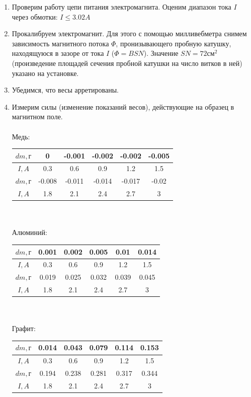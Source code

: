 \documentclass[a4paper, 12pt]{article}
\begin{document}
\begin{enumerate}
    \item Проверим работу цепи питания электромагнита. Оценим диапазон тока $I$ через обмотки: $I \leq 3.02 A$
    
    \item Прокалибруем электромагнит. 
    Для этого с помощью милливебметра снимем зависимость магнитного потока $\Phi$, пронизывающего пробную катушку, находящуюся в зазоре от тока $I$ ($\Phi = BSN$). 
    Значение $SN = 72 см^2$ (произведение площадей сечения пробной катушки на число витков в ней) указано на установке.

    \item Убедимся, что весы арретированы.
    
    \item Измерим силы (изменение показаний весов), действующие на образец в магнитном поле.
    \\\\
    Медь:
    \\
    \begin{tabular}{|c|c|c|c|c|c|} \hline
        $dm, г$ & 0 & -0.001 & -0.002 & -0.002 & -0.005 \\ \hline
        $I, A$ & 0.3 & 0.6 & 0.9 & 1.2 & 1.5\\ \hline
        $dm, г$ &-0.008 & -0.011 & -0.014 & -0.017 & -0.02 \\ \hline
        $I, A$ & 1.8 & 2.1 & 2.4 & 2.7 & 3 \\ \hline
    \end{tabular}
    \\\\
    Алюминий:
    \\
    \begin{tabular}{|c|c|c|c|c|c|} \hline
        $dm, г$ & 0.001 & 0.002 & 0.005 & 0.01 & 0.014 \\ \hline
        $I, A$ & 0.3 & 0.6 & 0.9 & 1.2 & 1.5 \\ \hline
        $dm, г$ & 0.019 & 0.025 & 0.032 & 0.039 & 0.045 \\ \hline
        $I, A$ & 1.8 & 2.1 & 2.4 & 2.7 & 3 \\ \hline
    \end{tabular}
    \\\\
    Графит:
    \\
    \begin{tabular}{|c|c|c|c|c|c|} \hline
        $dm, г$ & 0.014 & 0.043 & 0.079 & 0.114 & 0.153 \\ \hline
        $I, A$ & 0.3 & 0.6 & 0.9 & 1.2 & 1.5 \\ \hline
        $dm, г$ & 0.194 & 0.238 & 0.281 & 0.317 & 0.344 \\ \hline
        $I, A$ & 1.8 & 2.1 & 2.4 & 2.7 & 3 \\ \hline
    \end{tabular}
\end{enumerate}
\end{document}
